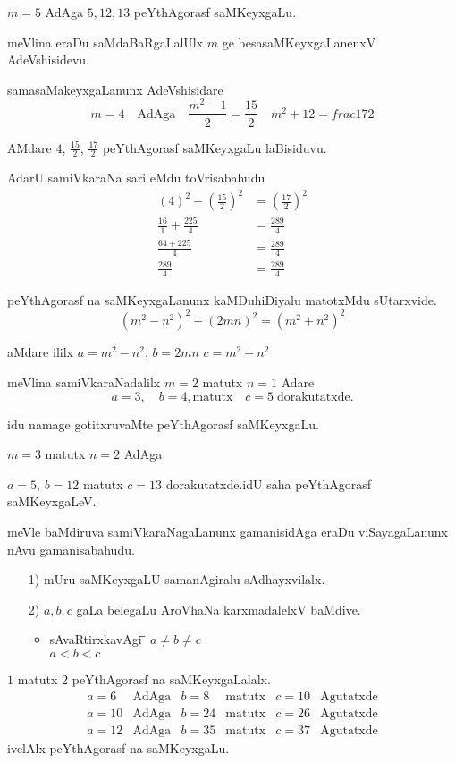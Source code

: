 $m=5$ AdAga $5,12,13$ peYthAgorasf saMKeyxgaLu.

meVlina eraDu saMdaBaRgaLalUlx $m$ ge besasaMKeyxgaLanenxV AdeVshisidevu.

samasaMakeyxgaLanunx AdeVshisidare
$$
m=4 \quad \text{AdAga}\quad \frac{m^2-1}{2}=\frac{15}{2} \quad {m^2+1}{2} = frac{17}{2}
$$

AMdare $4$, $\frac{15}{2}$, $\frac{17}{2}$ peYthAgorasf saMKeyxgaLu laBisiduvu.

AdarU samiVkaraNa sari eMdu toVrisabahudu
\begin{align*}
(4)^2+\left(\frac{15}{2}\right)^2 &= \left(\frac{17}{2}\right)^2\\
\frac{16}{1}+\frac{225}{4} &= \frac{289}{4}\\
\frac{64+225}{4} &= \frac{289}{4}\\
\frac{289}{4}&= \frac{289}{4}
\end{align*}

peYthAgorasf na saMKeyxgaLanunx kaMDuhiDiyalu matotxMdu sUtarxvide.
$$
\left(m^2-n^2\right)^2 + (2mn)^2 = (m^2+n^2)^2
$$

aMdare ililx\; $a=m^2-n^2$, \quad $b=2mn$ \quad {} \quad $c=m^2+n^2$

meVlina samiVkaraNadalilx $m=2$ matutx $n=1$ Adare
$$
a=3,\quad b=4, \text{matutx} \quad c=5 \; \text{dorakutatxde}.
$$

idu namage gotitxruvaMte peYthAgorasf saMKeyxgaLu.

$m=3$ \quad matutx \quad $n=2$ \quad AdAga

$a=5$, \quad $b=12$ \quad matutx\; $c=13$ \quad dorakutatxde.idU saha peYthAgorasf saMKeyxgaLeV.

meVle baMdiruva samiVkaraNagaLanunx gamanisidAga eraDu viSayagaLanunx nAvu gamanisabahudu.
\begin{enumerate}
\item[{\rm 1)}] mUru saMKeyxgaLU samanAgiralu sAdhayxvilalx.
\item[{\rm 2)}] $a,b,c$ gaLa belegaLu AroVhaNa karxmadalelxV baMdive.
\begin{itemize}
\item \begin{tabbing}
sAvaRtirxkavAgi \;\;
\= \= $a\neq  b \neq c$ \\
\> \> $a < b < c$
 \end{tabbing} 
\end{itemize}
\end{enumerate}

$1$ matutx $2$ peYthAgorasf na saMKeyxgaLalalx.
$$
\begin{array}{lclclc}
a=6 & \text{AdAga} &  b=8  & \text{matutx}  & c=10 &\text{Agutatxde}\\  
a=10 & \text{AdAga} & b=24  & \text{matutx} & c=26 &\text{Agutatxde}\\ 
a=12 & \text{AdAga} & b=35  & \text{matutx} & c=37 &\text{Agutatxde}
\end{array}
$$
ivelAlx peYthAgorasf na saMKeyxgaLu.

